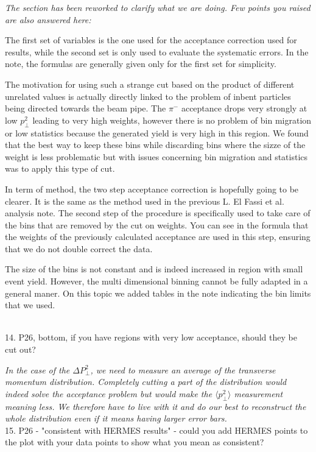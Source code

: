 \documentclass[12pt]{article}
\begin{document}
{ \it The section has been reworked to clarify what we are doing. Few points you raised 
are also answered here:

The first set of variables is the one used for the acceptance correction used for results,
while the second set is only used to evaluate the systematic errors. In the 
note, the formulas are generally given only for the first set for simplicity.

The motivation for using such a strange cut based on the product of different unrelated
values is actually directly linked to the problem of inbent 
particles being directed towards the beam pipe. The $\pi^-$ acceptance drops very 
strongly at low $p_\perp^2$ leading to very high weights, however there is no problem of 
bin migration
or low statistics because the generated yield is very high in this region. We found that 
the best way
to keep these bins while discarding bins where the sizze of the weight is less problematic 
but with issues concerning bin migration and statistics was to apply this type of cut.

In term of method, the two
step acceptance correction is hopefully going to be clearer. It is the same as the method used 
in the previous L. El Fassi et al. analysis note. The second step of the procedure is
specifically used to take care of the bins that are removed by the cut on weights. You 
can see in the formula that the weights
of the previously calculated acceptance are used in this step, ensuring that we do not
double correct the data.

The size of the bins is not constant and is indeed increased in region with small event yield.
However, the multi dimensional binning cannot be fully adapted in a general maner. On this
topic we added tables in the note indicating the bin limits that we used.} \\

14.
P26, bottom, if you have regions with very low acceptance, should they be cut out?

{\it In the case of the $\Delta P_\perp^2$, we need to measure an average of the
transverse momentum distribution. Completely cutting a part of the distribution
would indeed solve the acceptance problem but would make the $\langle p_\perp^2 \rangle$
measurement meaning less. We therefore have to live with it and do our best to
reconstruct the whole distribution even if it means having larger error bars.} \\


15.
P26 - "consistent with HERMES results" - could you add HERMES points to the plot with 
your data points to show what you mean as consistent?
\end{document}
